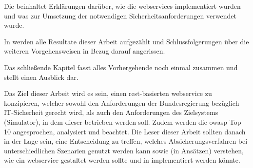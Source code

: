 	Die  beinhaltet Erklärungen darüber,
	wie die \glspl{webservice} implementiert wurden
	und was zur Umsetzung der notwendigen Sicherheitsanforderungen verwendet wurde.

	In  werden alle Resultate dieser Arbeit aufgezählt
	und Schlussfolgerungen über die weiteren Vorgehensweisen in Bezug darauf angerissen.

	Das schließende Kapitel  fasst alles Vorhergehende noch einmal zusammen
	und stellt einen Ausblick dar.

	Das Ziel dieser Arbeit wird es sein, einen \gls{rest}-basierten \gls{webservice} zu konzipieren,
	welcher sowohl den Anforderungen der Bundesregierung bezüglich IT-Sicherheit gerecht wird,
	als auch den Anforderungen des Zielsystems (Simulator),
	in dem dieser betrieben werden soll.
	Zudem werden die \gls{owasp} Top 10 angesprochen, analysiert und beachtet.
	Die Leser dieser Arbeit sollten danach in der Lage sein,
	eine Entscheidung zu treffen,
	welches Absicherungsverfahren bei unterschiedlichen Szenarien genutzt werden kann
	sowie (in Ansätzen) verstehen,
	wie ein \gls{webservice} gestaltet werden sollte und in  implementiert werden könnte.
